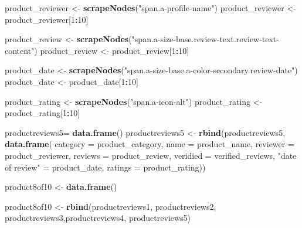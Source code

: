 \documentclass[
]{article}
\newenvironment{Shaded}{\begin{snugshade}}{\end{snugshade}}
\newcommand{\AttributeTok}[1]{\textcolor[rgb]{0.13,0.29,0.53}{#1}}
\newcommand{\DecValTok}[1]{\textcolor[rgb]{0.00,0.00,0.81}{#1}}
\newcommand{\FunctionTok}[1]{\textcolor[rgb]{0.13,0.29,0.53}{\textbf{#1}}}
\newcommand{\NormalTok}[1]{#1}
\newcommand{\OtherTok}[1]{\textcolor[rgb]{0.56,0.35,0.01}{#1}}
\newcommand{\SpecialCharTok}[1]{\textcolor[rgb]{0.81,0.36,0.00}{\textbf{#1}}}
\newcommand{\StringTok}[1]{\textcolor[rgb]{0.31,0.60,0.02}{#1}}
\begin{document}
\begin{Shaded}
\begin{Highlighting}[]
\NormalTok{  product\_reviewer }\OtherTok{\textless{}{-}} \FunctionTok{scrapeNodes}\NormalTok{(}\StringTok{"span.a{-}profile{-}name"}\NormalTok{)}
\NormalTok{  product\_reviewer }\OtherTok{\textless{}{-}}\NormalTok{ product\_reviewer[}\DecValTok{1}\SpecialCharTok{:}\DecValTok{10}\NormalTok{]}
  
\NormalTok{  product\_review }\OtherTok{\textless{}{-}} \FunctionTok{scrapeNodes}\NormalTok{(}\StringTok{"span.a{-}size{-}base.review{-}text.review{-}text{-}content"}\NormalTok{)}
\NormalTok{  product\_review }\OtherTok{\textless{}{-}}\NormalTok{ product\_review[}\DecValTok{1}\SpecialCharTok{:}\DecValTok{10}\NormalTok{]}
  
\NormalTok{  product\_date }\OtherTok{\textless{}{-}} \FunctionTok{scrapeNodes}\NormalTok{(}\StringTok{"span.a{-}size{-}base.a{-}color{-}secondary.review{-}date"}\NormalTok{)}
\NormalTok{  product\_date }\OtherTok{\textless{}{-}}\NormalTok{ product\_date[}\DecValTok{1}\SpecialCharTok{:}\DecValTok{10}\NormalTok{]}
  
\NormalTok{  product\_rating }\OtherTok{\textless{}{-}} \FunctionTok{scrapeNodes}\NormalTok{(}\StringTok{"span.a{-}icon{-}alt"}\NormalTok{)}
\NormalTok{  product\_rating }\OtherTok{\textless{}{-}}\NormalTok{ product\_rating[}\DecValTok{1}\SpecialCharTok{:}\DecValTok{10}\NormalTok{]}
  
\NormalTok{  productreviews5}\OtherTok{=} \FunctionTok{data.frame}\NormalTok{()}
\NormalTok{  productreviews5 }\OtherTok{\textless{}{-}} \FunctionTok{rbind}\NormalTok{(productreviews5, }\FunctionTok{data.frame}\NormalTok{(}
                      \AttributeTok{category =}\NormalTok{ product\_category,}
                      \AttributeTok{name =}\NormalTok{ product\_name,}
                      \AttributeTok{reviewer =}\NormalTok{ product\_reviewer,}
                      \AttributeTok{reviews =}\NormalTok{ product\_review,}
                      \AttributeTok{veridied =}\NormalTok{ verified\_reviews,}
                      \StringTok{"date of review"} \OtherTok{=}\NormalTok{ product\_date,}
                      \AttributeTok{ratings =}\NormalTok{ product\_rating))}
  
\NormalTok{  product8of10 }\OtherTok{\textless{}{-}} \FunctionTok{data.frame}\NormalTok{()}
  
\NormalTok{  product8of10 }\OtherTok{\textless{}{-}} \FunctionTok{rbind}\NormalTok{(productreviews1, productreviews2, productreviews3,productreviews4, productreviews5)}
\end{Highlighting}
\end{Shaded}
\end{document}
